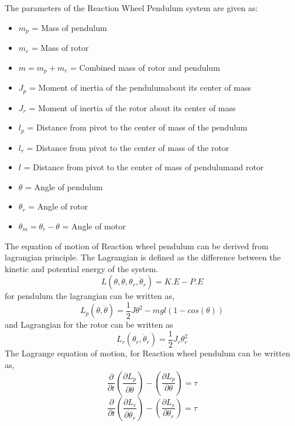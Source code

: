 \documentclass[a4paper]{article}
\begin{document}
The parameters of the Reaction Wheel Pendulum system are given as:
\begin{itemize}
	\item $m_p$ = Mass of pendulum
	\item $m_r$ = Mass of rotor
	\item $m = m_p+m_r$ = Combined mass of rotor and pendulum
	\item $J_p$ = Moment of inertia of the pendulumabout its center of mass
	\item $J_r$ = Moment of inertia of the rotor about its center of mass
	\item $l_p$ = Distance from pivot to the center of mass of the pendulum
	\item $l_r$ = Distance from pivot to the center of mass of the rotor
	\item $l$ = Distance from pivot to the center of mass of pendulumand rotor
	\item $\theta$ = Angle of pendulum
	\item $\theta_r$ = Angle of rotor
	\item $\theta_m = \theta_r-\theta$ = Angle of motor
\end{itemize}
The equation of motion of Reaction wheel pendulum can be derived from lagrangian principle. The Lagrangian is defined as the difference between the kinetic and potential energy of the system.
\begin{equation}
L(\theta,\dot \theta,\theta_r,\dot \theta_r) = K.E-P.E
\end{equation}
for pendulum the lagrangian can be written as,
\begin{equation}
L_p(\theta , \dot \theta) = \frac{1}{2}J\theta^2 - mgl(1-cos(\theta))
\label{eq:1}
\end{equation}
and Lagrangian for the rotor can be written as 
\begin{equation}
L_r(\theta_r , \dot \theta_r) = \frac{1}{2}J_r\theta_r^2
\label{eq:2}
\end{equation}
The Lagrange equation of motion, for Reaction wheel pendulum can be written as,
\begin{equation}
\frac{\partial}{\partial t}\left(\frac{\partial L_p}{\partial \dot \theta}\right) - \left(\frac{\partial L_p}{\partial \theta}\right) = \tau
\label{eq:3}
\end{equation}
\begin{equation}
\frac{\partial}{\partial t}\left(\frac{\partial L_r}{\partial \dot \theta_r}\right) - \left(\frac{\partial L_r}{\partial \theta_r}\right) = \tau
\label{eq:4}
\end{equation}
\end{document}
